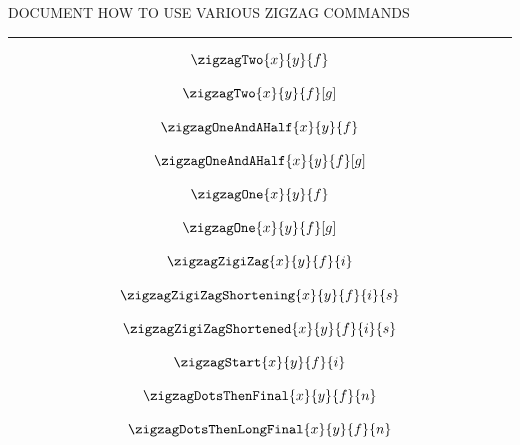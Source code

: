 DOCUMENT HOW TO USE VARIOUS ZIGZAG COMMANDS


\hrule

\begin{showexample}
\[
\arraycolsep=12pt
\zigzagTwo{x}{y}{f}
\]
\end{showexample}

\begin{showexample}
\[
\arraycolsep=7pt
\zigzagTwo{x}{y}{f}[g]
\]
\end{showexample}

\begin{showexample}
\[
\arraycolsep=7pt
\zigzagOneAndAHalf{x}{y}{f}
\]
\end{showexample}

\begin{showexample}
\[
\arraycolsep=7pt
\zigzagOneAndAHalf{x}{y}{f}[g]
\]
\end{showexample}

\begin{showexample}
\[
\arraycolsep=7pt
\zigzagOne{x}{y}{f}
\]
\end{showexample}

\begin{showexample}
\[
\arraycolsep=7pt
\zigzagOne{x}{y}{f}[g]
\]
\end{showexample}

\begin{showexample}
\[
\arraycolsep=7pt
\zigzagZigiZag{x}{y}{f}{i}
\]
\end{showexample}

\begin{showexample}
\[
\arraycolsep=7pt
\zigzagZigiZagShortening{x}{y}{f}{i}{s}
\]
\end{showexample}

\begin{showexample}
\[
\arraycolsep=7pt
\zigzagZigiZagShortened{x}{y}{f}{i}{s}
\]
\end{showexample}

\begin{showexample}
\[
\arraycolsep=7pt
\zigzagStart{x}{y}{f}{i}
\]
\end{showexample}

\begin{showexample}
\[
\arraycolsep=7pt
\zigzagDotsThenFinal{x}{y}{f}{n}
\]
\end{showexample}

\begin{showexample}
\[
\arraycolsep=7pt
\zigzagDotsThenLongFinal{x}{y}{f}{n}
\]
\end{showexample}

